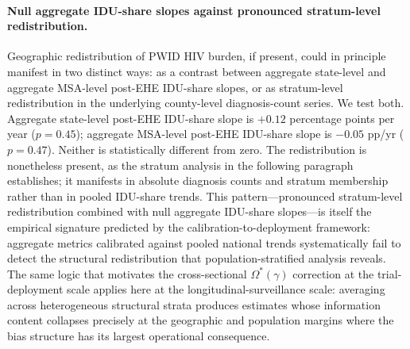 \documentclass[12pt]{article}
\begin{document}
\paragraph{Null aggregate IDU-share slopes against pronounced stratum-level redistribution.} Geographic redistribution of PWID HIV burden, if present, could in principle manifest in two distinct ways: as a contrast between aggregate state-level and aggregate MSA-level post-EHE IDU-share slopes, or as stratum-level redistribution in the underlying county-level diagnosis-count series. We test both. Aggregate state-level post-EHE IDU-share slope is $+0.12$ percentage points per year ($p = 0.45$); aggregate MSA-level post-EHE IDU-share slope is $-0.05$ pp/yr ($p = 0.47$).
Neither is statistically different from zero. The redistribution is nonetheless present, as the stratum analysis in the following paragraph establishes; it manifests in absolute diagnosis counts and stratum membership rather than in pooled IDU-share trends. This pattern---pronounced stratum-level redistribution combined with null aggregate IDU-share slopes---is itself the empirical signature predicted by the calibration-to-deployment framework: aggregate metrics calibrated against pooled national trends systematically fail to detect the structural redistribution that population-stratified analysis reveals. The same logic that motivates the cross-sectional $\Omega^*(\gamma)$ correction at the trial-deployment scale applies here at the longitudinal-surveillance scale: averaging across heterogeneous structural strata produces estimates whose information content collapses precisely at the geographic and population margins where the bias structure has its largest operational consequence.
\end{document}
